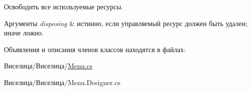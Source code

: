 Освободить все используемые ресурсы. 


\begin{DoxyParams}{Аргументы}
{\em disposing} & истинно, если управляемый ресурс должен быть удален; иначе ложно.\\
\hline
\end{DoxyParams}


Объявления и описания членов классов находятся в файлах\+:\begin{DoxyCompactItemize}
\item 
Виселица/Виселица/\hyperlink{_menu_8cs}{Menu.\+cs}\item 
Виселица/Виселица/Menu.\+Designer.\+cs\end{DoxyCompactItemize}

